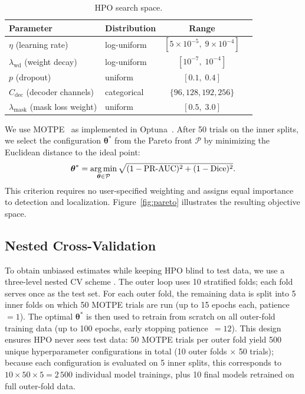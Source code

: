 \begin{table}[!t]
  \centering
  \caption{HPO search space.}
  \label{tab:hpo_space}
  \begin{tabular}{llcc}
    \toprule
    Parameter & Distribution & Range \\
    \midrule
    $\eta$ (learning rate) & log-uniform & $[5{\times}10^{-5},\; 9{\times}10^{-4}]$ \\
    $\lambda_{\text{wd}}$ (weight decay) & log-uniform & $[10^{-7},\; 10^{-4}]$ \\
    $p$ (dropout) & uniform & $[0.1,\; 0.4]$ \\
    $C_{\text{dec}}$ (decoder channels) & categorical & $\{96, 128, 192, 256\}$ \\
    $\lambda_{\text{mask}}$ (mask loss weight) & uniform & $[0.5,\; 3.0]$ \\
    \bottomrule
  \end{tabular}
\end{table}

We use MOTPE~\citep{motpe2022} as implemented in Optuna~\citep{optuna2019}.
After 50 trials on the inner splits, we select the configuration
$\boldsymbol{\theta}^*$ from the Pareto front $\mathcal{P}$ by minimizing the
Euclidean distance to the ideal point:
\begin{equation}
  \boldsymbol{\theta}^* = \operatorname*{arg\,min}_{\boldsymbol{\theta} \in \mathcal{P}}
    \sqrt{(1 - \text{PR-AUC})^2 + (1 - \text{Dice})^2}.
  \label{eq:ideal_point}
\end{equation}
This criterion requires no user-specified weighting and assigns equal importance
to detection and localization. Figure~\ref{fig:pareto} illustrates the
resulting objective space.

\subsection{Nested Cross-Validation}
\label{subsec:ncv}

To obtain unbiased estimates while keeping HPO blind to test data, we use a
three-level nested CV scheme \citep{varma2006bias}. The outer loop uses 10
stratified folds; each fold serves once as the test set. For each outer fold,
the remaining data is split into 5 inner folds on which 50 MOTPE trials are
run (up to 15 epochs each, patience~$=1$). The optimal $\boldsymbol{\theta}^*$
is then used to retrain from scratch on all outer-fold training data (up to 100
epochs, early stopping patience~$=12$). This design ensures HPO never sees test data: 50 MOTPE trials per outer fold
yield 500 unique hyperparameter configurations in total (10 outer
folds $\times$ 50 trials); because each configuration is evaluated on 5 inner
splits, this corresponds to $10 \times 50 \times 5 = 2\,500$ individual model
trainings, plus 10 final models retrained on full outer-fold data.
